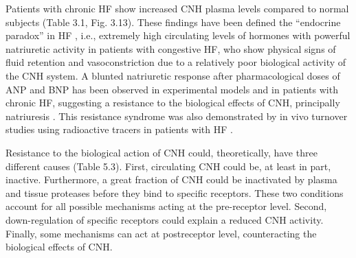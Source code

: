 \documentclass[14pt,a4paper,onecolumn]{extarticle}
\begin{document}

Patients with chronic HF show increased CNH plasma levels compared to normal subjects (Table 3.1, Fig. 3.13). These findings have been defined the “endocrine paradox” in HF \citep{bib36}, i.e., extremely high circulating levels of hormones with powerful natriuretic activity in patients with congestive HF, who show physical signs of fluid retention and vasoconstriction due to a relatively poor biological activity of the CNH system. A blunted natriuretic response after pharmacological doses of ANP and BNP has been observed in experimental models and in patients with chronic HF, suggesting a resistance to the biological effects of CNH, principally natriuresis \citep{bib324} \citep{bib325} \citep{bib326} \citep{bib327} \citep{bib328} \citep{bib329} \citep{bib330} \citep{bib331}. This resistance syndrome was also demonstrated by in vivo turnover studies using radioactive tracers in patients with HF \citep{bib332} \citep{bib333}.

Resistance to the biological action of CNH could, theoretically, have three different causes (Table 5.3). First, circulating CNH could be, at least in part, inactive. Furthermore, a great fraction of CNH could be inactivated by plasma and tissue proteases before they bind to specific receptors. These two conditions account for all possible mechanisms acting at the pre-receptor level. Second, down-regulation of specific receptors could explain a reduced CNH activity. Finally, some mechanisms can act at postreceptor level, counteracting the biological effects of CNH.

\end{document}
